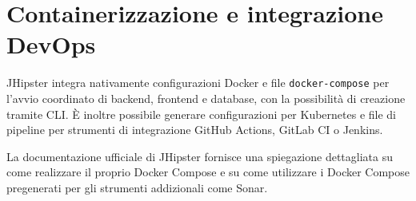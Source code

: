 \section{Containerizzazione e integrazione DevOps}

JHipster integra nativamente configurazioni Docker e file \texttt{docker-compose} per l’avvio coordinato di backend, frontend e database, con la possibilità di creazione tramite CLI. È inoltre possibile generare configurazioni per Kubernetes e file di pipeline per strumenti di integrazione GitHub Actions, GitLab CI o Jenkins.

La documentazione ufficiale di JHipster fornisce una spiegazione dettagliata su come realizzare il proprio Docker Compose e su come utilizzare i Docker Compose pregenerati per gli strumenti addizionali come Sonar.